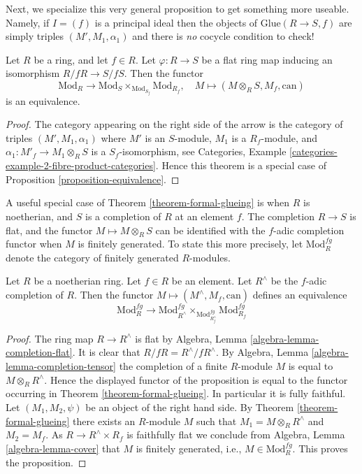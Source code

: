 \noindent
Next, we specialize this very general proposition to get something
more useable. Namely, if $I = (f)$ is a principal ideal then the objects
of $\text{Glue}(R \to S, f)$ are simply triples $(M', M_1, \alpha_1)$
and there is {\it no} cocycle condition to check!

\begin{theorem}
\label{theorem-formal-glueing}
Let $R$ be a ring, and let $f \in R$.
Let $\varphi : R \to S$ be a flat ring map inducing an isomorphism
$R/fR \to S/fS$. Then the functor
$$
\text{Mod}_R
\longrightarrow
\text{Mod}_S \times_{\text{Mod}_{S_f}} \text{Mod}_{R_f},
\quad
M
\longmapsto
(M \otimes_R S, M_f, \text{can})
$$
is an equivalence.
\end{theorem}

\begin{proof}
The category appearing on the right side of the arrow
is the category of triples $(M', M_1, \alpha_1)$ where $M'$ is an
$S$-module, $M_1$ is a $R_f$-module, and
$\alpha_1 : M'_f \to M_1 \otimes_R S$ is a $S_f$-isomorphism, see
Categories, Example \ref{categories-example-2-fibre-product-categories}.
Hence this theorem is a special case of
Proposition \ref{proposition-equivalence}.
\end{proof}

\noindent
A useful special case of
Theorem \ref{theorem-formal-glueing}
is when $R$ is noetherian, and $S$ is a completion of $R$ at an
element $f$. The completion $R \to S$ is flat, and the functor
$M \mapsto M \otimes_R S$ can be identified with the $f$-adic
completion functor when $M$ is finitely generated. To state
this more precisely, let $\text{Mod}^{fg}_R$ denote the category
of finitely generated $R$-modules.

\begin{proposition}
\label{proposition-formal-glueing}
Let $R$ be a noetherian ring.
Let $f \in R$ be an element.
Let $R^\wedge$ be the $f$-adic completion of $R$.
Then the functor $M \mapsto (M^\wedge, M_f, \text{can})$
defines an equivalence
$$
\text{Mod}^{fg}_R
\longrightarrow
\text{Mod}^{fg}_{R^\wedge}
\times_{\text{Mod}^{fg}_{R^\wedge_f}}
\text{Mod}^{fg}_{R_f}
$$
\end{proposition}

\begin{proof}
The ring map $R \to R^\wedge$ is flat by
Algebra, Lemma \ref{algebra-lemma-completion-flat}.
It is clear that $R/fR = R^\wedge/fR^\wedge$.
By
Algebra, Lemma \ref{algebra-lemma-completion-tensor}
the completion of a finite $R$-module $M$ is equal to $M \otimes_R R^\wedge$.
Hence the displayed functor of the proposition is equal to the
functor occurring in
Theorem \ref{theorem-formal-glueing}.
In particular it is fully faithful. Let $(M_1, M_2, \psi)$ be an
object of the right hand side. By
Theorem \ref{theorem-formal-glueing}
there exists an $R$-module $M$ such that
$M_1 = M \otimes_R R^\wedge$ and $M_2 = M_f$. As $R \to R^\wedge \times R_f$
is faithfully flat we conclude from
Algebra, Lemma \ref{algebra-lemma-cover}
that $M$ is finitely generated, i.e., $M \in \text{Mod}^{fg}_R$.
This proves the proposition.
\end{proof}


